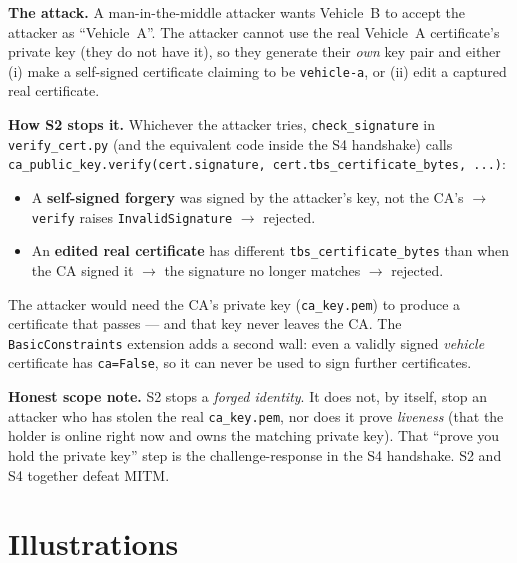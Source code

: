\documentclass[11pt,a4paper]{article}
\begin{document}
\textbf{The attack.} A man-in-the-middle attacker wants Vehicle~B to accept the
attacker as ``Vehicle~A''. The attacker cannot use the real Vehicle~A
certificate's private key (they do not have it), so they generate their \emph{own}
key pair and either (i) make a self-signed certificate claiming to be
\texttt{vehicle-a}, or (ii) edit a captured real certificate.

\textbf{How S2 stops it.} Whichever the attacker tries, \texttt{check\_signature}
in \texttt{verify\_cert.py} (and the equivalent code inside the S4 handshake)
calls \texttt{ca\_public\_key.verify(cert.signature,
cert.tbs\_certificate\_bytes, ...)}:
\begin{itemize}
  \item A \textbf{self-signed forgery} was signed by the attacker's key, not the
        CA's $\to$ \texttt{verify} raises \texttt{InvalidSignature} $\to$ rejected.
  \item An \textbf{edited real certificate} has different
        \texttt{tbs\_certificate\_bytes} than when the CA signed it $\to$ the
        signature no longer matches $\to$ rejected.
\end{itemize}
The attacker would need the CA's private key (\texttt{ca\_key.pem}) to produce a
certificate that passes --- and that key never leaves the CA. The
\texttt{BasicConstraints} extension adds a second wall: even a validly signed
\emph{vehicle} certificate has \texttt{ca=False}, so it can never be used to sign
further certificates.

\textbf{Honest scope note.} S2 stops a \emph{forged identity}. It does not, by
itself, stop an attacker who has stolen the real \texttt{ca\_key.pem}, nor does
it prove \emph{liveness} (that the holder is online right now and owns the
matching private key). That ``prove you hold the private key'' step is the
challenge-response in the S4 handshake. S2 and S4 together defeat MITM.

\section{Illustrations}
\end{document}
